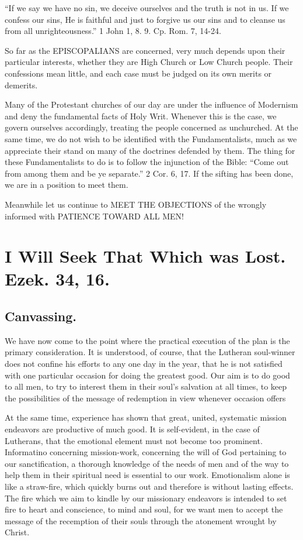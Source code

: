 \documentclass[
]{book}
\begin{document}
``If we say we have no sin, we deceive ourselves and the truth is not in us. If we confess our sins, He is faithful and just to forgive us our sins and to cleanse us from all unrighteousness.'' 1 John 1, 8. 9. Cp. Rom. 7, 14-24.

So far as the EPISCOPALIANS are concerned, very much depends upon their particular interests, whether they are High Church or Low Church people. Their confessions mean little, and each case must be judged on its own merits or demerits.

Many of the Protestant churches of our day are under the influence of Modernism and deny the fundamental facts of Holy Writ. Whenever this is the case, we govern ourselves accordingly, treating the people concerned as unchurched. At the same time, we do not wish to be identified with the Fundamentalists, much as we appreciate their stand on many of the doctrines defended by them. The thing for these Fundamentalists to do is to follow the injunction of the Bible: ``Come out from among them and be ye separate.'' 2 Cor. 6, 17. If the sifting has been done, we are in a position to meet them.

Meanwhile let us continue to MEET THE OBJECTIONS of the wrongly informed with PATIENCE TOWARD ALL MEN!

\hypertarget{i-will-seek-that-which-was-lost.-ezek.-34-16.}{%
\chapter{I Will Seek That Which was Lost. Ezek. 34, 16.}\label{i-will-seek-that-which-was-lost.-ezek.-34-16.}}

\hypertarget{canvassing.}{%
\section*{Canvassing.}\label{canvassing.}}

We have now come to the point where the practical execution of the plan is the primary consideration. It is understood, of course, that the Lutheran soul-winner does not confine his efforts to any one day in the year, that he is not satisfied with one particular occasion for doing the greatest good. Our aim is to do good to all men, to try to interest them in their soul's salvation at all times, to keep the possibilities of the message of redemption in view whenever occasion offers

At the same time, experience has shown that great, united, systematic mission endeavors are productive of much good. It is self-evident, in the case of Lutherans, that the emotional element must not become too prominent. Informatino concerning mission-work, concerning the will of God pertaining to our sanctification, a thorough knowledge of the needs of men and of the way to help them in their spiritual need is essential to our work. Emotionalism alone is like a straw-fire, which quickly burns out and therefore is without lasting effects. The fire which we aim to kindle by our missionary endeavors is intended to set fire to heart and conscience, to mind and soul, for we want men to accept the message of the recemption of their souls through the atonement wrought by Christ.
\end{document}
